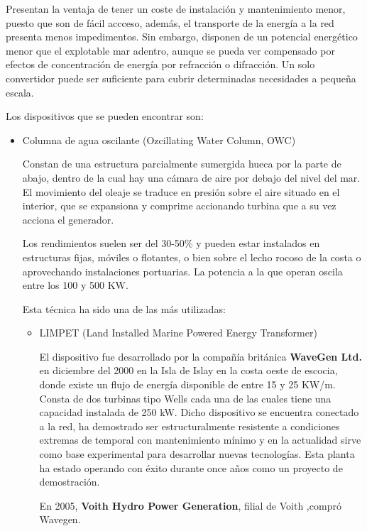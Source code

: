 Presentan la ventaja de tener un coste de instalación y mantenimiento
menor, puesto que son de fácil accceso, además, el transporte de la
energía a la red presenta menos impedimentos. Sin embargo, disponen de
un potencial energético menor que el explotable mar adentro, aunque se
pueda ver compensado por efectos de concentración de energía por
refracción o difracción. Un solo convertidor puede ser suficiente para
cubrir determinadas necesidades a pequeña escala.

Los dispositivos que se pueden encontrar son:

\begin{itemize}
\item
  Columna de agua oscilante (Ozcillating Water Column, OWC)

  Constan de una estructura parcialmente sumergida hueca por la parte de
  abajo, dentro de la cual hay una cámara de aire por debajo del nivel
  del mar. El movimiento del oleaje se traduce en presión sobre el aire
  situado en el interior, que se expansiona y comprime accionando
  turbina que a su vez acciona el generador.

  Los rendimientos suelen ser del 30-50\% y pueden estar instalados en
  estructuras fijas, móviles o flotantes, o bien sobre el lecho rocoso
  de la costa o aprovechando instalaciones portuarias. La potencia a la
  que operan oscila entre los 100 y 500 KW.

  Esta técnica ha sido una de las más utilizadas:

  \begin{itemize}
  \item
    LIMPET (Land Installed Marine Powered Energy Transformer)

    El dispositivo fue desarrollado por la compañía británica
    \textbf{WaveGen Ltd.} en diciembre del 2000 en la Isla de Islay en
    la costa oeste de escocia, donde existe un flujo de energía
    disponible de entre 15 y 25 KW/m. Consta de dos turbinas tipo Wells
    cada una de las cuales tiene una capacidad instalada de 250 kW.
    Dicho dispositivo se encuentra conectado a la red, ha demostrado ser
    estructuralmente resistente a condiciones extremas de temporal con
    mantenimiento mínimo y en la actualidad sirve como base experimental
    para desarrollar nuevas tecnologías. Esta planta ha estado operando
    con éxito durante once años como un proyecto de demostración.

    En 2005, \textbf{Voith Hydro Power Generation}, filial de Voith
    ,compró Wavegen.


\end{itemize}
\end{itemize}
